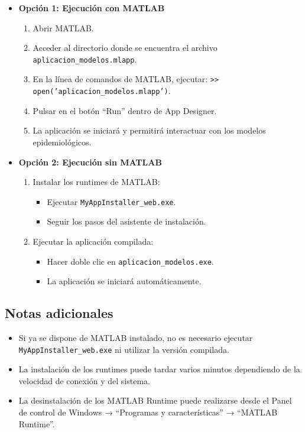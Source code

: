 \begin{itemize}
    \item \textbf{Opción 1: Ejecución con MATLAB}
    \begin{enumerate}
        \raggedright
        \item Abrir MATLAB.
        \item Acceder al directorio donde se encuentra el archivo \texttt{aplicacion\_modelos.mlapp}.
        \item En la línea de comandos de MATLAB, ejecutar: \texttt{\textgreater{}\textgreater{} open('aplicacion\_modelos.mlapp')}.
        \item Pulsar en el botón “Run” dentro de App Designer.
        \item La aplicación se iniciará y permitirá interactuar con los modelos epidemiológicos.
    \end{enumerate}

    \item \textbf{Opción 2: Ejecución sin MATLAB}
    \begin{enumerate}
        \item Instalar los runtimes de MATLAB:
        \begin{itemize}
            \item Ejecutar \texttt{MyAppInstaller\_web.exe}.
            \item Seguir los pasos del asistente de instalación.
        \end{itemize}
        \item Ejecutar la aplicación compilada:
        \begin{itemize}
            \item Hacer doble clic en \texttt{aplicacion\_modelos.exe}.
            \item La aplicación se iniciará automáticamente.
        \end{itemize}
    \end{enumerate}
\end{itemize}

\subsection*{Notas adicionales}

\begin{itemize}
    \item Si ya se dispone de MATLAB instalado, no es necesario ejecutar \texttt{MyAppInstaller\_web.exe} ni utilizar la versión compilada.
    \item La instalación de los runtimes puede tardar varios minutos dependiendo de la velocidad de conexión y del sistema.
    \item La desinstalación de los MATLAB Runtime puede realizarse desde el Panel de control de Windows → “Programas y características” → “MATLAB Runtime”.
\end{itemize}



